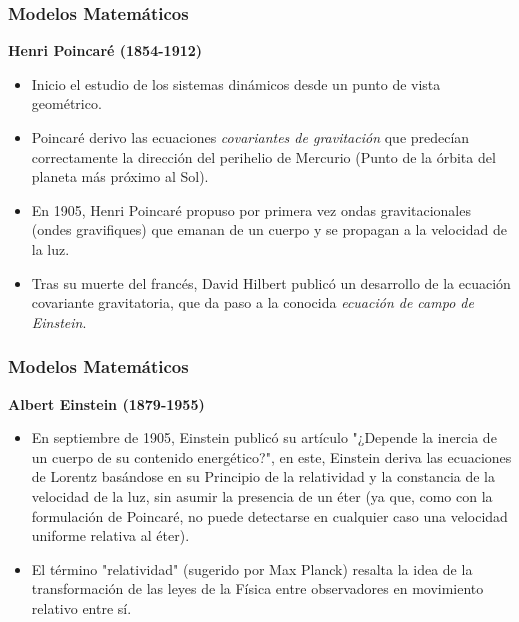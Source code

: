 \begin{frame}
\frametitle{Modelos Matemáticos}

\textbf{Henri Poincaré (1854-1912)}

\begin{itemize}[<+->]

\item Inicio el estudio de los sistemas dinámicos desde un punto de vista geométrico.

\item Poincaré derivo las ecuaciones \textit{covariantes de gravitación} que predecían correctamente la dirección del perihelio de Mercurio (Punto de la órbita del planeta más próximo al Sol). 

\item En 1905, Henri Poincaré propuso por primera vez ondas gravitacionales (ondes gravifiques) que emanan de un cuerpo y se propagan a la velocidad de la luz.

\item Tras su muerte del francés, David Hilbert publicó un desarrollo de la ecuación covariante gravitatoria, que da paso a la conocida \textit{ecuación de campo de Einstein}.

\end{itemize}

\end{frame}







\begin{frame}
\frametitle{Modelos Matemáticos}

\textbf{Albert Einstein (1879-1955)}

\begin{itemize}[<+->]

\item  En septiembre de 1905, Einstein publicó su artículo "¿Depende la inercia de un cuerpo de su contenido energético?", en este, Einstein deriva las ecuaciones de Lorentz basándose en su Principio de la relatividad y la constancia de la velocidad de la luz, sin asumir la presencia de un éter (ya que, como con la formulación de Poincaré, no puede detectarse en cualquier caso una velocidad uniforme relativa al éter). 
\item El término "relatividad" (sugerido por Max Planck) resalta la idea de la transformación de las leyes de la Física entre observadores en movimiento relativo entre sí.

\end{itemize}

\end{frame}






